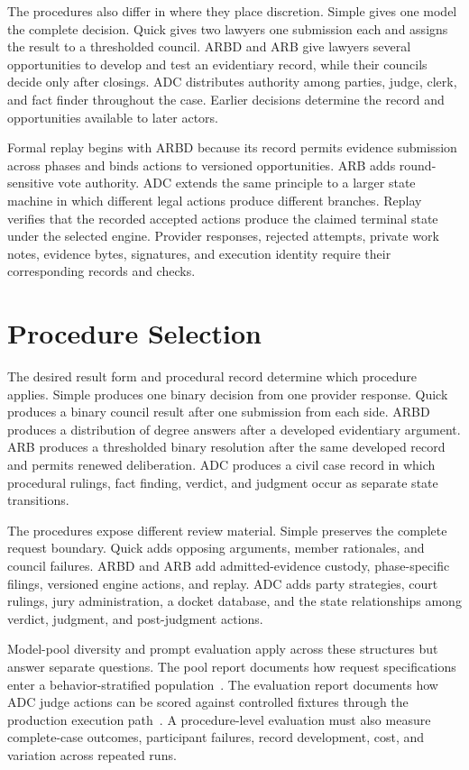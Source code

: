 \documentclass[11pt]{article}
\begin{document}
The procedures also differ in where they place discretion.  Simple gives one model the complete decision.  Quick gives two lawyers one submission each and assigns the result to a thresholded council.  ARBD and ARB give lawyers several opportunities to develop and test an evidentiary record, while their councils decide only after closings.  ADC distributes authority among parties, judge, clerk, and fact finder throughout the case.  Earlier decisions determine the record and opportunities available to later actors.

Formal replay begins with ARBD because its record permits evidence submission across phases and binds actions to versioned opportunities.  ARB adds round-sensitive vote authority.  ADC extends the same principle to a larger state machine in which different legal actions produce different branches.  Replay verifies that the recorded accepted actions produce the claimed terminal state under the selected engine.  Provider responses, rejected attempts, private work notes, evidence bytes, signatures, and execution identity require their corresponding records and checks.

\section{Procedure Selection}

The desired result form and procedural record determine which procedure applies.  Simple produces one binary decision from one provider response.  Quick produces a binary council result after one submission from each side.  ARBD produces a distribution of degree answers after a developed evidentiary argument.  ARB produces a thresholded binary resolution after the same developed record and permits renewed deliberation.  ADC produces a civil case record in which procedural rulings, fact finding, verdict, and judgment occur as separate state transitions.

The procedures expose different review material.  Simple preserves the complete request boundary.  Quick adds opposing arguments, member rationales, and council failures.  ARBD and ARB add admitted-evidence custody, phase-specific filings, versioned engine actions, and replay.  ADC adds party strategies, court rulings, jury administration, a docket database, and the state relationships among verdict, judgment, and post-judgment actions.

Model-pool diversity and prompt evaluation apply across these structures but answer separate questions.  The pool report documents how request specifications enter a behavior-stratified population~\cite{poolpaper}.  The evaluation report documents how ADC judge actions can be scored against controlled fixtures through the production execution path~\cite{evalpaper}.  A procedure-level evaluation must also measure complete-case outcomes, participant failures, record development, cost, and variation across repeated runs.
\end{document}
